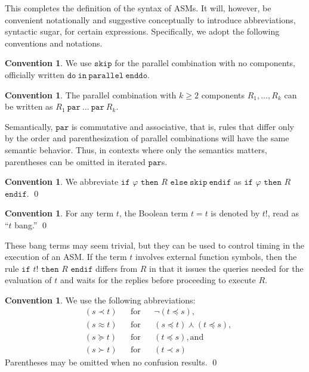\documentclass{LMCS}
\theoremstyle{definition}
\newtheorem{conn}[thm]{Convention}
\newcommand{\kand}{\curlywedge}
\newcommand{\ttt}[1]{\ensuremath{\mathtt {#1}}}
\renewcommand{\phi}{\varphi}
\begin{document}
This completes the definition of the syntax of ASMs.  It will, however, be
convenient notationally and suggestive conceptually to introduce
abbreviations, syntactic sugar, for certain expressions.  Specifically, we
adopt the following conventions and notations.



\begin{conn}
  We use \ttt{skip} for the parallel combination with no components,
  officially written \ttt{do\ in\ parallel\ enddo}.
\end{conn}

\begin{conn}
The parallel combination with $k\geq2$ components $R_1,\ldots,R_k$ can
     be written as $R_1\ttt{\ par\ }\dots\ttt{\ par\ }R_k$.
\end{conn}

Semantically, \ttt{par} is commutative and associative, that is, rules
that differ only by the order and parenthesization of parallel
combinations will have the same semantic behavior.  Thus, in contexts
where only the semantics matters, parentheses can be omitted in
iterated \ttt{par}s.

\begin{conn}
  We abbreviate \ttt{if} $\phi$ \ttt{then} $R$ \ttt{else\ skip\ endif}
  as \ttt{if} $\phi$ \ttt{then} $R$ \ttt{endif}.
\qed\end{conn}

\begin{conn}
  For any term $t$, the Boolean term $t=t$ is denoted by $t!$, read as
  ``$t$ bang.''
\qed\end{conn}

These bang terms may seem trivial, but they can be used to control
timing in the execution of an ASM.  If the term $t$ involves external
function symbols, then the rule \ttt{if} $t!$ \ttt{then} $R$
\ttt{endif} differs from $R$ in that it issues the queries needed for
the evaluation of $t$ and waits for the replies before proceeding to
execute $R$.

\begin{conn}
  We use the following abbreviations:
\begin{align*}
    &(s \prec t)   &&\text{for} &&\neg(t \preceq s),  \\
    &(s \approx t)   &&\text{for} &&(s \preceq t) \kand (t \preceq s),\\
    &(s \succeq t) &&\text{for} &&(t \preceq s), \text{and}\\
    &(s \succ t)   &&\text{for} &&(t \prec s)
\end{align*}
Parentheses may be omitted when no confusion results.
\qed\end{conn}
\end{document}
